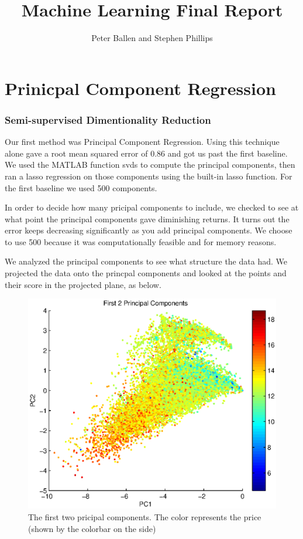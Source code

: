 \documentclass[a4paper,10pt]{article}
\title{Machine Learning Final Report}
\author{Peter Ballen and Stephen Phillips}
\begin{document}
\maketitle

\section{Prinicpal Component Regression}
\subsubsection*{Semi-supervised Dimentionality Reduction}
Our first method was Principal Component Regression. Using this technique alone gave a root mean squared error of 0.86 and got us past the first baseline. We used the MATLAB function svds to compute the principal components, then ran a lasso regression on those components using the built-in lasso function.  For the first baseline we used 500 components.

In order to decide how many pricipal components to include, we checked to see at what point the principal components gave diminishing returns. It turns out the error keeps decreasing significantly as you add principal components. We choose to use 500 because it was computationally feasible and for memory reasons.

We analyzed the principal components to see what structure the data had. We projected the data onto the princpal components and looked at the points and their score in the projected plane, as below.

\begin{figure}[H]
 \centering
 \includegraphics[scale=0.5]{First2PCs.eps}
 \caption{The first two pricipal components. The color represents the price (shown by the colorbar on the side)}
\end{figure}
\end{document}
